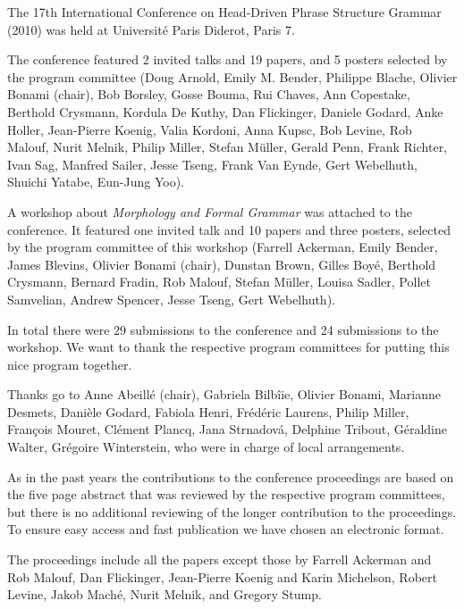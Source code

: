 The 17th International Conference on Head-Driven Phrase Structure Grammar (2010) was held at Université Paris Diderot, Paris 7.

The conference featured 2 invited talks and 19 papers, and 5 posters selected by the program committee (Doug Arnold,
Emily M. Bender, Philippe Blache, Olivier Bonami (chair), Bob Borsley, Gosse Bouma, Rui Chaves, Ann
Copestake,
Berthold Crysmann, Kordula De Kuthy, Dan Flickinger, Daniele Godard, Anke Holler, Jean-Pierre
Koenig, Valia Kordoni, Anna Kupsc, Bob Levine, Rob Malouf, Nurit Melnik, Philip Miller, Stefan
Müller, Gerald Penn, Frank Richter, Ivan Sag, Manfred Sailer, Jesse Tseng, Frank Van Eynde, Gert
Webelhuth, Shuichi Yatabe, Eun-Jung Yoo).

A workshop about \emph{Morphology and Formal Grammar}
was attached to the conference. It featured one invited talk and 10 papers and three posters, selected by the program
committee of this workshop (Farrell Ackerman,
Emily Bender,
James Blevins,
Olivier Bonami (chair),
Dunstan Brown,
Gilles Boyé,
Berthold Crysmann,
Bernard Fradin,
Rob Malouf,
Stefan Müller,
Louisa Sadler,
Pollet Samvelian,
Andrew Spencer,
Jesse Tseng,
Gert Webelhuth).


In total there were 29  submissions to the conference and 24 submissions to the workshop.
We want to thank the respective program committees for putting this nice program together.



Thanks go to Anne Abeillé (chair), Gabriela Bilbîie, Olivier Bonami, Marianne Desmets, Danièle Godard,
Fabiola Henri,
Frédéric Laurens,
Philip Miller,
François Mouret,
Clément Plancq,
Jana Strnadová,
Delphine Tribout,
Géraldine Walter,
Grégoire Winterstein, who were in charge of local arrangements.


As in the past years the contributions to the conference proceedings are based on the five page abstract
that was reviewed by the respective program committees, but there is no additional reviewing of the
longer contribution to the proceedings.
To ensure easy access and fast publication we have chosen an electronic format.


The proceedings include all the papers except those by Farrell Ackerman and Rob Malouf, Dan Flickinger, Jean-Pierre Koenig and Karin
Michelson, Robert Levine, Jakob Maché, Nurit Melnik, and Gregory Stump.
